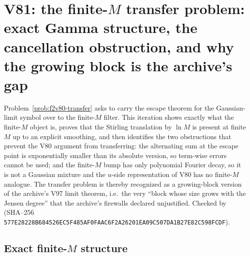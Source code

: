 \documentclass[11pt]{article}
\theoremstyle{definition}
\theoremstyle{remark}
\begin{document}




\clearpage
\section{V81: the finite-\texorpdfstring{$M$}{M} transfer problem: exact Gamma structure, the cancellation obstruction, and why the growing block is the archive's gap}
\label{sec:f2v81-transfer}
\begingroup
\setcounter{equation}{0}
\renewcommand{\theequation}{N81.\arabic{equation}}
\renewcommand{\theHequation}{f2v81.\arabic{equation}}

Problem~\ref{prob:f2v80-transfer} asks to carry the escape theorem for
the Gaussian-limit symbol over to the finite-\(M\) filter.  This
iteration shows exactly what the finite-\(M\) object is, proves that the
Stirling translation by \(\ln M\) is present at finite \(M\) up to an
explicit smoothing, and then identifies the two obstructions that
prevent the V80 argument from transferring: the alternating sum at the
escape point is exponentially smaller than its absolute version, so
term-wise errors cannot be used; and the finite-\(M\) bump has only
polynomial Fourier decay, so it is not a Gaussian mixture and the
\(u\)-side representation of V80 has no finite-\(M\) analogue.  The
transfer problem is thereby recognized as a growing-block version of the
archive's V97 limit theorem, i.e.\ the very ``block whose size grows
with the Jensen degree'' that the archive's firewalls declared
unjustified.  Checked by
 (SHA--256
\texttt{577E28228B684526EC5F485AF0FAAC6F}\allowbreak\texttt{2A26201EA09C507DA1B27E82C598FCDF}).

\subsection{Exact finite-\(M\) structure}
\end{document}
